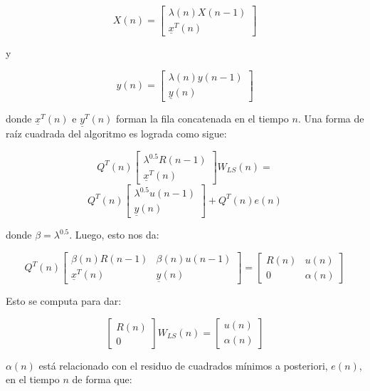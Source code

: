 \[
X(n)=
	\left[ 
		\begin{array}{c}
			\lambda(n)X(n-1) \\
			\underline{x}^T(n)
		\end{array}
	\right] 
\]

y

\[
y(n)=
	\left[ 
		\begin{array}{c}
			\lambda(n)y(n-1) \\
			\underline{y}(n)
		\end{array}
	\right] 
\]

donde $\underline{x}^T(n)$ e $\underline{y}^T(n)$ forman la fila concatenada en el tiempo $n$. Una forma de raíz cuadrada del algoritmo es lograda como sigue:

\[
Q^T(n)
	\left[ 
		\begin{array}{c}
			\lambda^{0.5} R(n-1)     \\
			\underline{x}^T(n) 
		\end{array}
	\right]
	W_{LS}(n) =
\]
\[
Q^T(n)
	\left[ 
		\begin{array}{c}
			\lambda^{0.5} u(n-1)     \\
			\underline{y}(n) 
		\end{array}
	\right]
	+ Q^T(n)e(n)
\]

donde $\beta = \lambda^{0.5}$. Luego, esto nos da:

\[
Q^T(n)
	\left[ 
		\begin{array}{cc}
			\beta(n)R(n-1)     & \beta(n)u(n-1)  \\
			\underline{x}^T(n) & \underline{y}(n)
		\end{array}
	\right] 
	=
	\left[ 
		\begin{array}{cc}
			R(n) & u(n)  \\
			0    & \alpha(n)
		\end{array}
	\right]
\]

Esto se computa para dar:

\[
	\left[ 
		\begin{array}{c}
			R(n) \\
			0    
		\end{array}
	\right] 
	W_{LS}(n)
	=
	\left[ 
		\begin{array}{c}
			u(n) \\
			\alpha(n)
		\end{array}
	\right]
\]

$\alpha(n)$ está relacionado con el residuo de cuadrados mínimos a posteriori, $e(n)$, en el tiempo $n$ de forma que:

